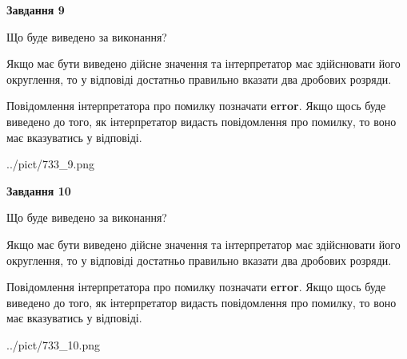 \documentclass[12pt, ukrainian]{article}
\begin{document}
{\begin {Large}
{\begin {center}\textbf{Завдання 9}\end {center}}\par
Що буде виведено за виконання? \par

Якщо має бути виведено дійсне значення та інтерпретатор має здійснювати його округлення, 
то у відповіді достатньо правильно вказати два дробових розряди.

Повідомлення інтерпретатора про помилку позначати \textbf{error}.
Якщо щось буде виведено до того, як інтерпретатор видасть повідомлення про помилку, 
то воно має вказуватись у відповіді. \par

\begin{center}
	{../pict/733_9.png}
\end{center}
\newpage

{\begin {center}\textbf{Завдання 10}\end {center}}\par
Що буде виведено за виконання? \par

Якщо має бути виведено дійсне значення та інтерпретатор має здійснювати його округлення, 
то у відповіді достатньо правильно вказати два дробових розряди.

Повідомлення інтерпретатора про помилку позначати \textbf{error}.
Якщо щось буде виведено до того, як інтерпретатор видасть повідомлення про помилку, 
то воно має вказуватись у відповіді. \par

\begin{center}
	{../pict/733_10.png}
\end{center}
\newpage

\end {Large}}
\end{document}
